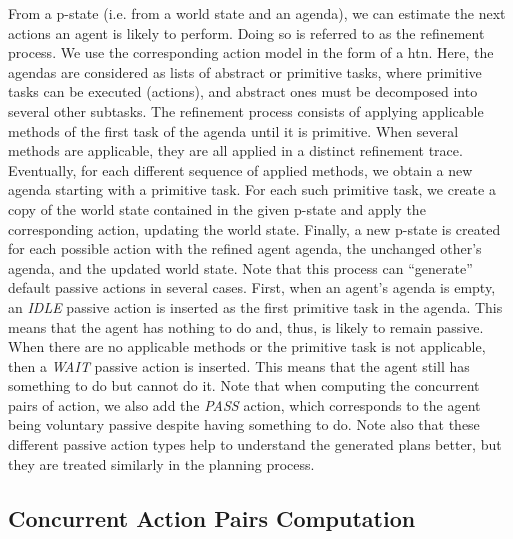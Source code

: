 From a p-state (i.e. from a world state and an agenda), we can estimate the next actions an agent is likely to perform. Doing so is referred to as the refinement process. We use the corresponding action model in the form of a \acrfull{htn}. Here, the agendas are considered as lists of abstract or primitive tasks, where primitive tasks can be executed (actions), and abstract ones must be decomposed into several other subtasks. 
The refinement process consists of applying applicable methods of the first task of the agenda until it is primitive. When several methods are applicable, they are all applied in a distinct refinement trace.
Eventually, for each different sequence of applied methods, we obtain a new agenda starting with a primitive task. For each such primitive task, we create a copy of the world state contained in the given p-state and apply the corresponding action, updating the world state. 
Finally, a new p-state is created for each possible action with the refined agent agenda, the unchanged other's agenda, and the updated world state. 
Note that this process can ``generate'' default passive actions in several cases. First, when an agent's agenda is empty, an \textit{IDLE} passive action is inserted as the first primitive task in the agenda. This means that the agent has nothing to do and, thus, is likely to remain passive. When there are no applicable methods or the primitive task is not applicable, then a \textit{WAIT} passive action is inserted. This means that the agent still has something to do but cannot do it. Note that when computing the concurrent pairs of action, we also add the \textit{PASS} action, which corresponds to the agent being voluntary passive despite having something to do. Note also that these different passive action types help to understand the generated plans better, but they are treated similarly in the planning process.

    \subsection{Concurrent Action Pairs Computation}

